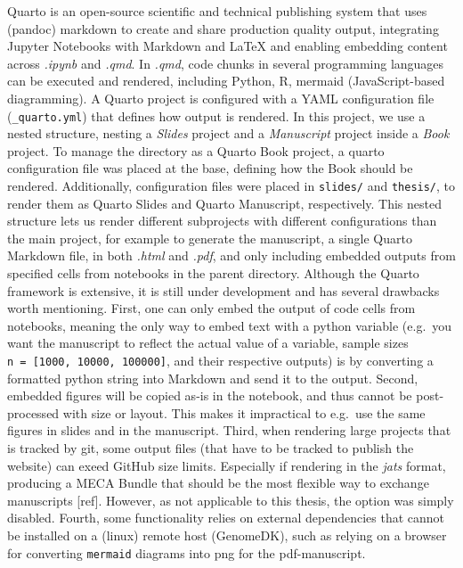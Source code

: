 \documentclass[
  11pt,
  a4paper,
]{scrbook}
\let\oldemph\emph
\renewcommand\emph[1]{\oldemph{\color{gray}#1}}
\begin{document}
Quarto is an open-source scientific and technical publishing system that
uses (pandoc) markdown to create and share production quality output,
integrating Jupyter Notebooks with Markdown and LaTeX and enabling
embedding content across \emph{.ipynb} and \emph{.qmd}. In \emph{.qmd},
code chunks in several programming languages can be executed and
rendered, including Python, R, mermaid (JavaScript-based diagramming). A
Quarto project is configured with a YAML configuration file
(\texttt{\_quarto.yml}) that defines how output is rendered. In this
project, we use a nested structure, nesting a \emph{Slides} project and
a \emph{Manuscript} project inside a \emph{Book} project. To manage the
directory as a Quarto Book project, a quarto configuration file was
placed at the base, defining how the Book should be rendered.
Additionally, configuration files were placed in \texttt{slides/} and
\texttt{thesis/}, to render them as Quarto Slides and Quarto Manuscript,
respectively. This nested structure lets us render different subprojects
with different configurations than the main project, for example to
generate the manuscript, a single Quarto Markdown file, in both
\emph{.html} and \emph{.pdf}, and only including embedded outputs from
specified cells from notebooks in the parent directory. Although the
Quarto framework is extensive, it is still under development and has
several drawbacks worth mentioning. First, one can only embed the output
of code cells from notebooks, meaning the only way to embed text with a
python variable (e.g.~you want the manuscript to reflect the actual
value of a variable, sample sizes
\texttt{n\ =\ {[}1000,\ 10000,\ 100000{]}}, and their respective
outputs) is by converting a formatted python string into Markdown and
send it to the output. Second, embedded figures will be copied as-is in
the notebook, and thus cannot be post-processed with size or layout.
This makes it impractical to e.g.~use the same figures in slides and in
the manuscript. Third, when rendering large projects that is tracked by
git, some output files (that have to be tracked to publish the website)
can exeed GitHub size limits. Especially if rendering in the \emph{jats}
format, producing a MECA Bundle that should be the most flexible way to
exchange manuscripts {[}ref{]}. However, as not applicable to this
thesis, the option was simply disabled. Fourth, some functionality
relies on external dependencies that cannot be installed on a (linux)
remote host (GenomeDK), such as relying on a browser for converting
\texttt{mermaid} diagrams into png for the pdf-manuscript.
\end{document}

